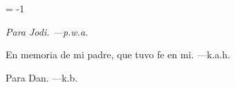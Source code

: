 %




\pageno = -1


% 
{}

\noheadlinetrue\pagebreak


% 
\blankpage

\blankpage


{ }
\noheadlinetrue


% 
\sinkage
{\it \flushright
   Para Jodi.
   ---{\sc p.w.a.}
   
   En memoria de mi padre,
   que tuvo fe en mi.
   ---{\sc k.a.h.}
   
   Para Dan.
   ---{\sc k.b.}
}
\pagebreak



\blankpage
{ }

% 
% 
\rewritetocfilefalse
%
\blankpage
{}

\shortcontents


\ifcompletebook \global\rewritetocfiletrue \fi


\contents

\blankpage
{ }

\byebye
